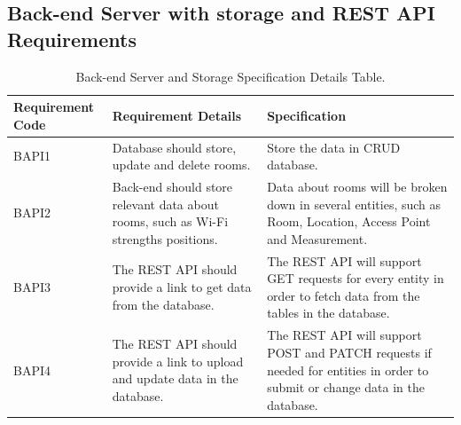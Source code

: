 \subsection{Back-end Server with storage and REST API Requirements}
\setlength\tabcolsep{4pt}
\begin{longtable}[c]{| p{2cm} | p{5cm} | p{5cm} |}
\caption{Back-end Server and Storage Specification Details Table.\label{long}}\\
 
\hline
Requirement Code & Requirement Details & Specification \\
\hline 
\endhead


\hline
\endlastfoot
BAPI1 & Database should store, update and delete rooms. & Store the data in CRUD database.\\
\hline
BAPI2 & Back-end should store relevant data about rooms, such as Wi-Fi strengths positions. & Data about rooms will be broken down in several entities, such as Room, Location, Access Point and Measurement.\\
\hline
BAPI3 & The REST API should provide a link to get data from the database. & The REST API will support GET requests for every entity in order to fetch data from the tables in the database.\\
\hline
BAPI4 & The REST API should provide a link to upload and update data in the database. & The REST API will support POST and PATCH requests if needed for entities in order to submit or change data in the database.\\
\end{longtable}

